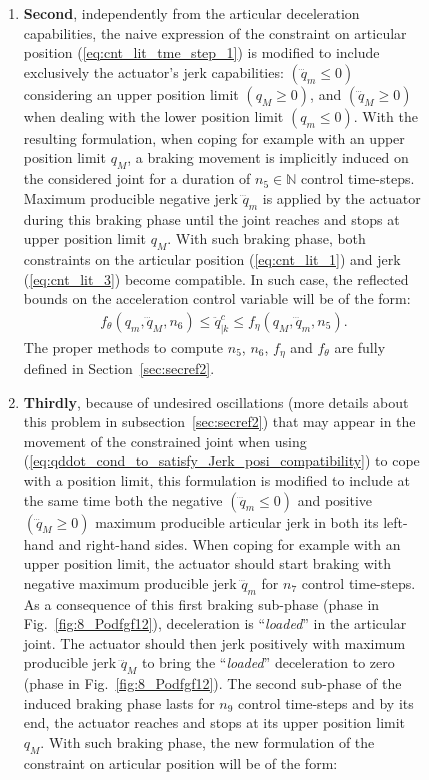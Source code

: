 \begin{figure}[!htbp]
\begin{enumerate}
\item \textbf{Second}, independently from the articular deceleration capabilities, the naive expression of the constraint on articular position (\ref{eq:cnt_lit_tme_step_1}) is modified to include exclusively the actuator's jerk capabilities: $(\dddot{q}_m \leq 0)$ considering an upper position limit $(q_M \geq 0)$, and $(\dddot{q}_M \geq 0)$ when dealing with the lower position limit $(q_m \leq 0)$. With the resulting formulation, when coping for example with an upper position limit $q_M$, a braking movement is implicitly induced on the considered joint for a duration of $n_{5} \in \mathbb{N}$ control time-steps. Maximum producible negative jerk $\dddot{q}_m$ is applied by the actuator during this braking phase until the joint reaches and stops at upper position limit $q_{M}$. With such braking phase, both constraints on the articular position (\ref{eq:cnt_lit_1}) and jerk (\ref{eq:cnt_lit_3}) become compatible. In such case, the reflected bounds on the acceleration control variable will be of the form:
\begin{equation}
\begin{split}
f_{\theta}(q_m, \dddot{q}_M, n_6) \leq \ddot{q}_{|k}^{c} \leq f_{\eta}(q_M, \dddot{q}_m, n_5). 
\label{eq:qddot_cond_to_satisfy_Jerk_posi_compatibility}
\end{split}
\end{equation}
The proper methods to compute $n_5$, $n_6$, $f_{\eta}$ and $f_{\theta}$ are fully defined in Section~\ref{sec:secref2}. 
\item \textbf{Thirdly}, because of undesired oscillations (more details about this problem in subsection~\ref{sec:secref2}) that may appear in the movement of the constrained joint when using (\ref{eq:qddot_cond_to_satisfy_Jerk_posi_compatibility}) to cope with a position limit, this formulation is modified to include at the same time both the negative  $(\dddot{q}_m \leq 0)$ and positive $(\dddot{q}_M \geq 0)$ maximum producible articular jerk in both its left-hand and right-hand sides. When coping for example with an upper position limit, the  actuator should start braking with negative maximum producible jerk $\dddot{q}_m$ for $n_7$ control time-steps. As a consequence of this first braking sub-phase (phase  in Fig.~\ref{fig:8_Podfgf12}), deceleration is ``\textit{loaded}'' in the articular joint. The actuator should then jerk positively with maximum producible jerk $\dddot{q}_M$ to bring the ``\textit{loaded}'' deceleration to zero (phase  in Fig.~\ref{fig:8_Podfgf12}). The second sub-phase of the induced braking phase lasts for $n_9$ control time-steps and by its end, the actuator reaches and stops at its upper position limit $q_M$.  With such braking phase, the new formulation of the constraint on articular position will be of the form:

\end{enumerate}
\end{figure}
